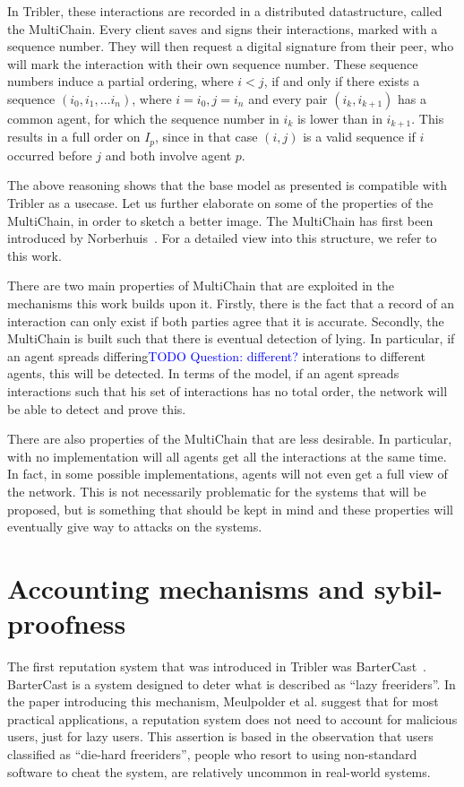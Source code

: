\documentclass[a4paper,11pt]{book}
\newcommand\question[1]{\textcolor{blue}{TODO Question: #1}}
\theoremstyle{definition}
\begin{document}
In Tribler, these interactions are recorded in a distributed datastructure, called the MultiChain.
Every client saves and signs their interactions, marked with a sequence number. They will then request
a digital signature from their peer, who will mark the interaction with their own sequence number.
These sequence numbers induce a partial ordering, where $i < j$, if and only if there exists
a sequence $(i_0, i_1, \ldots i_n)$, where $i=i_0, j=i_n$ and every pair $(i_k, i_{k+1})$ has
a common agent, for which the sequence number in $i_k$ is lower than in $i_{k+1}$.
This results in a full order on $I_p$, since in that case $(i, j)$ is a valid sequence if
$i$ occurred before $j$ and both involve agent $p$.

The above reasoning shows that the base model as presented is compatible with Tribler as a usecase.
Let us further elaborate on some of the properties of the MultiChain, in order to sketch a better image.
The MultiChain has first been introduced by Norberhuis~\cite{norberhuis2015multichain}. For a detailed
view into this structure, we refer to this work.

There are two main properties of MultiChain that are exploited in the mechanisms this work builds upon it.
Firstly, there is the fact that a record of an interaction can only exist if both parties agree that it
is accurate. Secondly, the MultiChain is built such that there is eventual detection of lying. In particular,
if an agent spreads differing\question{different?} interations to different agents, this will be detected. In terms of the model,
if an agent spreads interactions such that his set of interactions has no total order, the network will
be able to detect and prove this. 

There are also properties of the MultiChain that are less desirable. In particular, with no implementation
will all agents get all the interactions at the same time. In fact, in some possible implementations, 
agents will not even get a full view of the network. This is not necessarily problematic for the systems
that will be proposed, but is something that should be kept in mind and these properties will eventually
give way to attacks on the systems. 


\chapter{Accounting mechanisms and sybil-proofness}
\label{chap:netflow}

The first reputation system that was introduced in Tribler was BarterCast~\cite{meulpolder2009bartercast}.
BarterCast is a system designed to deter what is described as ``lazy freeriders''.
In the paper introducing this mechanism, Meulpolder et al. suggest that for most practical applications, 
a reputation system does not
need to account for malicious users, just for lazy users. This assertion is based in the observation
that users classified as ``die-hard freeriders'', people who resort to using non-standard software to
cheat the system, are relatively uncommon in real-world systems. 
\end{document}
